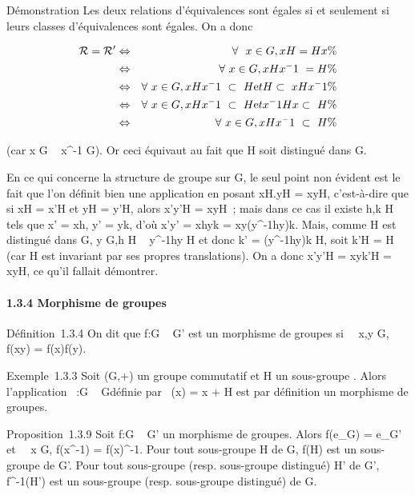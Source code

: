 \documentclass[]{article}
\begin{document}
Démonstration Les deux relations d'équivalences sont égales si et
seulement si leurs classes d'équivalences sont égales. On a donc

\begin{align*} \mathcal{R} = \mathcal{R}'& \Leftrightarrow
& \forall~~x \in G, xH = Hx \%&
\\ & \Leftrightarrow &
\forall~x \in G, xHx^-1~ = H \%&
\\ & \Leftrightarrow &
\forall~x \in G, xHx^-1~ \subset~
H\text et H \subset~ xHx^-1\%&
\\ & \Leftrightarrow &
\forall~x \in G, xHx^-1~ \subset~
H\text et x^-1Hx \subset~ H\%&
\\ & \Leftrightarrow &
\forall~x \in G, xHx^-1~ \subset~ H \%&
\\ \end{align*}

(car x \in G \rigtharrow~ x^-1 \in G). Or ceci équivaut au fait que H soit
distingué dans G.

En ce qui concerne la structure de groupe sur G\diagupH, le seul point non
évident est le fait que l'on définit bien une application en posant
xH.yH = xyH, c'est-à-dire que si xH = x'H et yH = y'H, alors x'y'H =
xyH~; mais dans ce cas il existe h,k \in H tels que x' = xh, y' = yk, d'où
x'y' = xhyk = xy(y^-1hy)k. Mais, comme H est distingué dans
G, y \in G,h \in H \rigtharrow~ y^-1hy \in H et donc k' = (y^-1hy)k
\in H, soit k'H = H (car H est invariant par ses propres translations). On
a donc x'y'H = xyk'H = xyH, ce qu'il fallait démontrer.

\paragraph{1.3.4 Morphisme de groupes}

Définition~1.3.4 On dit que f:G \rightarrow~ G' est un morphisme de groupes si
\forall~~x,y \in G, f(xy) = f(x)f(y).

Exemple~1.3.3 Soit (G,+) un groupe commutatif et H un sous-groupe .
Alors l'application \pi~:G \rightarrow~ G\diagupH définie par \pi~(x) = x + H est par
définition un morphisme de groupes.

Proposition~1.3.9 Soit f:G \rightarrow~ G' un morphisme de groupes. Alors
f(e\_G) = e\_G' et \forall~~x \in G,
f(x^-1) = f(x)^-1. Pour tout sous-groupe H de G,
f(H) est un sous-groupe de G'. Pour tout sous-groupe (resp. sous-groupe
distingué) H' de G', f^-1(H') est un sous-groupe (resp.
sous-groupe distingué) de G.
\end{document}
